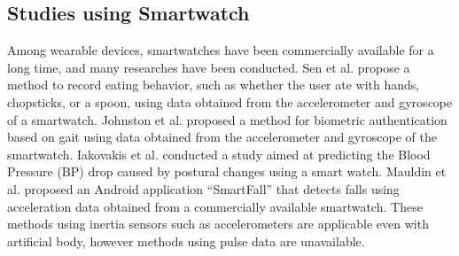 \documentclass[sigchi,authordraft]{acmart}
\begin{document}
\subsection{Studies using Smartwatch}
Among wearable devices, smartwatches have been commercially available for a long time, and many researches have been conducted.
Sen et al.\cite{eating_recognition} propose a method to record eating behavior, such as whether the user ate with hands, chopsticks, or a spoon, using data obtained from the accelerometer and gyroscope of a smartwatch. 
Johnston et al.\cite{smartwatch_walk_authentication} proposed a method for biometric authentication based on gait using data obtained from the accelerometer and gyroscope of the smartwatch.
Iakovakis et al.\cite{oh_detection} conducted a study aimed at predicting the Blood Pressure (BP) drop caused by postural changes using a smart watch. 
Mauldin et al.\cite{smartfall} proposed an Android application ``SmartFall'' that detects falls using acceleration data obtained from a commercially available smartwatch. 
These methods using inertia sensors such as accelerometers are applicable even with artificial body, however methods using pulse data are unavailable.

\end{document}
